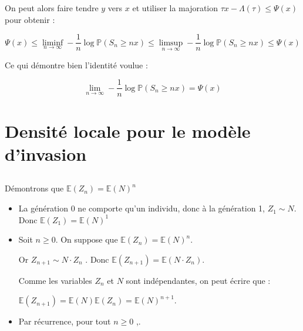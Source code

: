\documentclass[12pt,titlepage=true]{article}
\newcommand{\esp}{\mathbb{E}}
\renewcommand{\P}{\mathbb{P}}
\begin{document}
			On peut alors faire tendre $y$ vers $x$ et utiliser la majoration $\tau x - \Lambda(\tau) \leqslant \Psi(x) $ pour obtenir : 
		
			\begin{equation*}
				\Psi(x) \leqslant \liminf_{n\rightarrow\infty}-\frac{1}{n} \log \P(S_n \geqslant nx) \leqslant 	\limsup_{n\to\infty}-\frac{1}{n} \log \P(S_n \geqslant nx) \leqslant \Psi(x) 
			\end{equation*}
		
			Ce qui démontre bien l'identité voulue :
		
			\begin{equation}
				\boxed{\lim_{n\to\infty}-\frac{1}{n} \log \P(S_n \geqslant nx) = \Psi(x)} \label{resQ4}
			\end{equation}
		
		\subsection{} %
		
	\section{Densité locale pour le modèle d'invasion}
		\subsection{} %
			
			Démontrons que $\esp(Z_n)=\esp(N)^n$
			\begin{itemize}
			
				\item	La génération 0 ne comporte qu'un individu, donc à la génération 1, $Z_1\sim N$. Donc $\esp(Z_1)=\esp(N)^1$
				
				\item	Soit $n\geqslant 0$. On suppose que $\esp(Z_n)=\esp(N)^n$.
				
						Or $Z_{n+1}\sim N \cdotp Z_n$ . Donc $\esp(Z_{n+1}) = \esp(N \cdotp Z_n)$.
						
						Comme les variables $Z_n$ et $N$ sont indépendantes, on peut écrire que :
						
						$\esp(Z_{n+1}) = \esp(N) \esp( Z_n) = \esp(N)^{n+1}$.
				\item Par récurrence, pour tout $n\geqslant0 $ ,\fbox{ $\esp(Z_n)=\esp(N)^n$}.
				
			\end{itemize}
	
\end{document}
